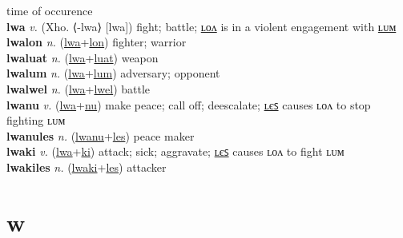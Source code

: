 time of occurence \label{lwelkwekilum} \\
\textbf{lwa} \textit{v.} (Xho. ⟨-lwa⟩ [lwa])
fight; battle; \hyperref[lwalon]{ʟᴏᴧ} is in a violent engagement with \hyperref[lwalum]{ʟᴜᴍ} \label{lwa} \\
\textbf{lwalon} \textit{n.} (\hyperref[lwa]{lwa}+\hyperref[lon]{lon})
fighter; warrior \label{lwalon} \\
\textbf{lwaluat} \textit{n.} (\hyperref[lwa]{lwa}+\hyperref[luat]{luat})
weapon \label{lwaluat} \\
\textbf{lwalum} \textit{n.} (\hyperref[lwa]{lwa}+\hyperref[lum]{lum})
adversary; opponent \label{lwalum} \\
\textbf{lwalwel} \textit{n.} (\hyperref[lwa]{lwa}+\hyperref[lwel]{lwel})
battle \label{lwalwel} \\
\textbf{lwanu} \textit{v.} (\hyperref[lwa]{lwa}+\hyperref[nu]{nu})
make peace; call off; deescalate; \hyperref[lwanules]{ʟєꜱ} causes ʟᴏᴧ to stop fighting ʟᴜᴍ \label{lwanu} \\
\textbf{lwanules} \textit{n.} (\hyperref[lwanu]{lwanu}+\hyperref[les]{les})
peace maker \label{lwanules} \\
\textbf{lwaki} \textit{v.} (\hyperref[lwa]{lwa}+\hyperref[ki]{ki})
attack; sick; aggravate; \hyperref[lwakiles]{ʟєꜱ} causes ʟᴏᴧ to fight ʟᴜᴍ \label{lwaki} \\
\textbf{lwakiles} \textit{n.} (\hyperref[lwaki]{lwaki}+\hyperref[les]{les})
attacker \label{lwakiles} 

\section{w}

